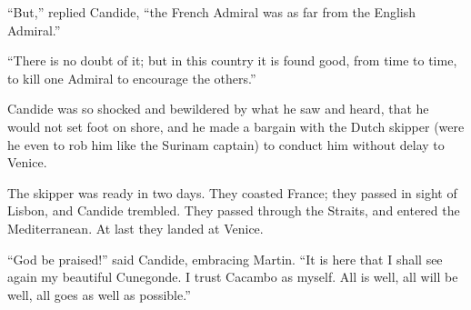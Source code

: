 ``But,'' replied Candide, ``the French Admiral was as far from the English Admiral.''

``There is no doubt of it; but in this country it is found good, from time to time, to kill one Admiral to encourage the others.''

Candide was so shocked and bewildered by what he saw and heard, that he would not set foot on shore, and he made a bargain with the Dutch skipper (were he even to rob him like the Surinam captain) to conduct him without delay to Venice.

The skipper was ready in two days. They coasted France; they passed in sight of Lisbon, and Candide trembled. They passed through the Straits, and entered the Mediterranean. At last they landed at Venice.

``God be praised!'' said Candide, embracing Martin. ``It is here that I shall see again my beautiful Cunegonde. I trust Cacambo as myself. All is well, all will be well, all goes as well as possible.''

